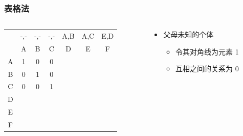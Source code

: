 \documentclass[serif,aspectratio=169]{beamer}
\begin{document}
\begin{frame}
  \frametitle{表格法}
  \begin{columns}
    \begin{column}{.5\textwidth}
      \centering
      \begin{tabular}{c|ccc|ccc}
        & -,- & -,- & -,- & A,B & A,C & E,D\\
        & A & B & C & D & E & F\\\hline
        A & 1 & 0 & 0\\
        B & 0 & 1 & 0\\
        C & 0 & 0 & 1\\\hline
        D & & &\\
        E & & &\\
        F & & &
      \end{tabular}
    \end{column}

    \begin{column}{.5\textwidth}
      \begin{itemize}
      \item 父母未知的个体
        \begin{itemize}
        \item 令其对角线为元素 1
        \item 互相之间的关系为 0
        \end{itemize}
      \end{itemize}
    \end{column}
  \end{columns}
\end{frame}
\end{document}
